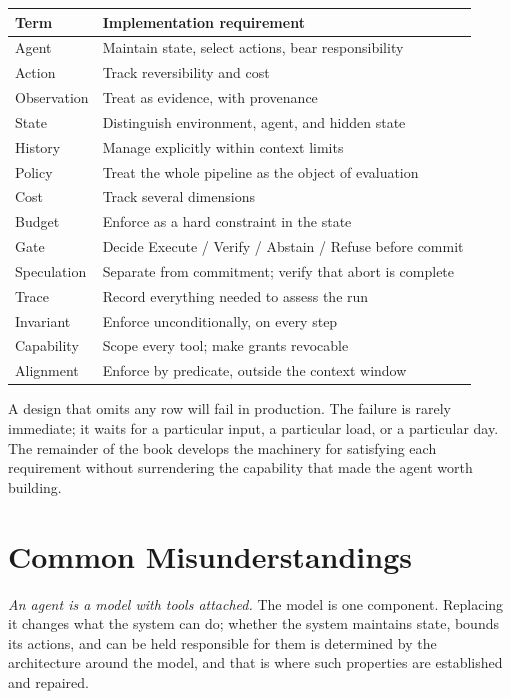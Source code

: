\documentclass[11pt]{book}
\begin{document}
\begin{center}
\begin{tabular}{ll}
\toprule
Term & Implementation requirement \\
\midrule
Agent & Maintain state, select actions, bear responsibility \\
Action & Track reversibility and cost \\
Observation & Treat as evidence, with provenance \\
State & Distinguish environment, agent, and hidden state \\
History & Manage explicitly within context limits \\
Policy & Treat the whole pipeline as the object of evaluation \\
Cost & Track several dimensions \\
Budget & Enforce as a hard constraint in the state \\
Gate & Decide Execute / Verify / Abstain / Refuse before commit \\
Speculation & Separate from commitment; verify that abort is complete \\
Trace & Record everything needed to assess the run \\
Invariant & Enforce unconditionally, on every step \\
Capability & Scope every tool; make grants revocable \\
Alignment & Enforce by predicate, outside the context window \\
\bottomrule
\end{tabular}
\end{center}

A design that omits any row will fail in production. The failure is rarely immediate; it waits for a particular input, a particular load, or a particular day. The remainder of the book develops the machinery for satisfying each requirement without surrendering the capability that made the agent worth building.

\section{Common Misunderstandings}

\textit{An agent is a model with tools attached.} The model is one component. Replacing it changes what the system can do; whether the system maintains state, bounds its actions, and can be held responsible for them is determined by the architecture around the model, and that is where such properties are established and repaired.
\end{document}
